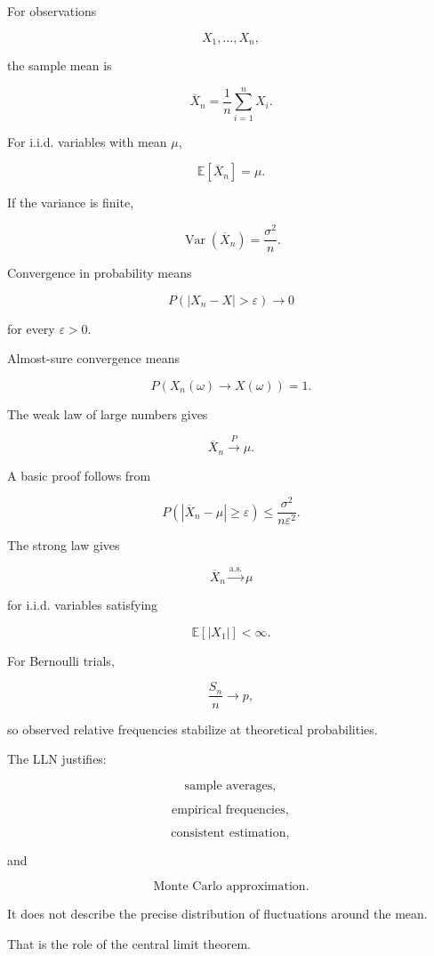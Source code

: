 For observations

\[
X_1,\ldots,X_n,
\]

the sample mean is

\[
\boxed{
\overline{X}_n
=
\frac1n
\sum_{i=1}^{n}X_i.
}
\]

For i.i.d. variables with mean \(\mu\),

\[
\boxed{
\mathbb{E}[\overline{X}_n]
=
\mu.
}
\]

If the variance is finite,

\[
\boxed{
\operatorname{Var}(\overline{X}_n)
=
\frac{\sigma^2}{n}.
}
\]

Convergence in probability means

\[
\boxed{
P(|X_n-X|>\varepsilon)
\to0
}
\]

for every \(\varepsilon>0\).

Almost-sure convergence means

\[
\boxed{
P
\left(
X_n(\omega)\to X(\omega)
\right)
=
1.
}
\]

The weak law of large numbers gives

\[
\boxed{
\overline{X}_n
\xrightarrow{P}
\mu.
}
\]

A basic proof follows from

\[
\boxed{
P
\left(
|\overline{X}_n-\mu|
\geq\varepsilon
\right)
\leq
\frac{
\sigma^2
}{
n\varepsilon^2
}.
}
\]

The strong law gives

\[
\boxed{
\overline{X}_n
\xrightarrow{\text{a.s.}}
\mu
}
\]

for i.i.d. variables satisfying

\[
\mathbb{E}[|X_1|]<\infty.
\]

For Bernoulli trials,

\[
\boxed{
\frac{S_n}{n}
\to
p,
}
\]

so observed relative frequencies stabilize at theoretical
probabilities.

The LLN justifies:

\[
\boxed{
\text{sample averages},
}
\]

\[
\boxed{
\text{empirical frequencies},
}
\]

\[
\boxed{
\text{consistent estimation},
}
\]

and

\[
\boxed{
\text{Monte Carlo approximation}.
}
\]

It does not describe the precise distribution of fluctuations around the
mean.

That is the role of the central limit theorem.

